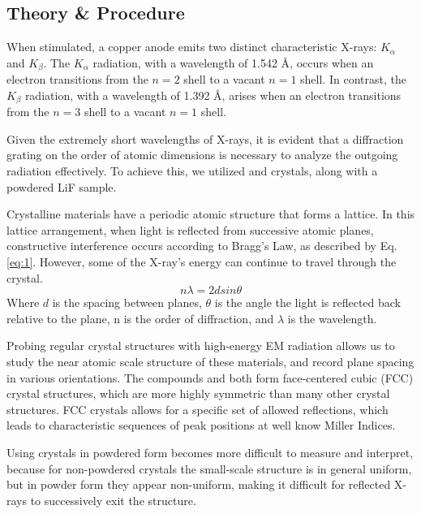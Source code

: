 \documentclass[a4paper,12pt,english]{all-in-one} %
\begin{document}
\begin{multicols}{2}

\section*{Theory \& Procedure}
{
When stimulated, a copper anode emits two distinct characteristic X-rays: $K_\alpha$ and $K_\beta$. The $K_\alpha$ radiation, with a wavelength of 1.542 Å, occurs when an electron transitions from the $n=2$ shell to a vacant $n=1$ shell. In contrast, the $K_\beta$ radiation, with a wavelength of 1.392 Å, arises when an electron transitions from the $n=3$ shell to a vacant $n=1$ shell.

Given the extremely short wavelengths of X-rays, it is evident that a diffraction grating on the order of atomic dimensions is necessary to analyze the outgoing radiation effectively. To achieve this, we utilized  and  crystals, along with a powdered LiF sample.

Crystalline materials have a periodic atomic structure that forms a lattice. In this lattice arrangement, when light is reflected from successive atomic planes, constructive interference occurs according to Bragg's Law, as described by Eq.\eqref{eq:1}. However, some of the X-ray's energy can continue to travel through the crystal.
\begin{equation}\label{eq:1}
    n\lambda = 2dsin\theta
\end{equation}
Where $d$ is the spacing between planes, $\theta$ is the angle the light is reflected back relative to the plane, n is the order of diffraction, and $\lambda$ is the wavelength.

Probing regular crystal structures with high-energy EM radiation allows us to study the near atomic scale structure of these materials, and record plane spacing in various orientations. The compounds  and  both form face-centered cubic (FCC) crystal structures, which are more highly symmetric than many other crystal structures. FCC crystals allows for a specific set of allowed reflections, which leads to characteristic sequences of peak positions at well know Miller Indices. 

Using crystals in powdered form becomes more difficult to measure and interpret, because for non-powdered crystals the small-scale structure is in general uniform, but in powder form they appear non-uniform, making it difficult for reflected X-rays to successively exit the structure.

}
\end{multicols}
\end{document}
